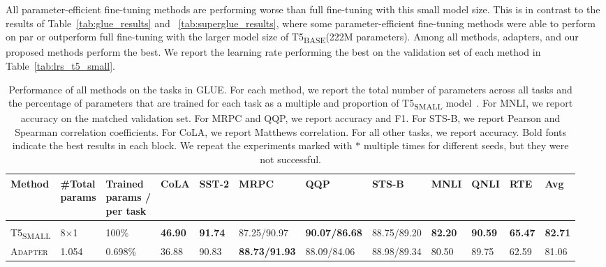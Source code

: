 \documentclass{article}
\newcommand{\basebase}{T5\textsubscript{\tiny BASE}\xspace}
\newcommand{\basesmall}{T5\textsubscript{\tiny SMALL}\xspace}
\newcommand{\adapter}{\textsc{Adapter}\xspace}
\begin{document}
All parameter-efficient fine-tuning methods are performing worse than full fine-tuning with this small model size. This is in contrast to the results of Table~\ref{tab:glue_results} and ~\ref{tab:superglue_results}, where some parameter-efficient fine-tuning methods were able to perform on par or outperform full fine-tuning with the larger model size of \basebase (222M parameters). Among all methods, adapters, and our proposed methods perform the best. We report the learning rate performing the best on the validation set of each method in Table~\ref{tab:lrs_t5_small}.
\begin{table}[H] %
\centering 
\caption{Performance of all methods on the tasks in GLUE. For each method, we report the total number of parameters across all tasks and the percentage of parameters that are trained for each task as a multiple and proportion of \basesmall model~\citep{raffel2019exploring}. For MNLI, we report accuracy on the matched validation set. For MRPC and QQP, we report accuracy and F1. For STS-B, we report Pearson and Spearman correlation coefficients. For CoLA, we report Matthews correlation. For all other tasks, we report accuracy. Bold fonts indicate the best results in each block. We repeat the experiments marked with $*$ multiple times for different seeds, but they were not successful.}
\begin{adjustbox}{max width=\textwidth}
\begin{tabular}{l@{\hskip 0.02in}|l@{\hskip 0.06in}l@{\hskip 0.0in}|l@{\hskip 0.08in}l@{\hskip 0.08in}l@{\hskip 0.08in}l@{\hskip 0.08in}l@{\hskip 0.08in}l@{\hskip 0.08in}l@{\hskip 0.08in}l|l}
\toprule %
\textbf{Method} & \pbox{3cm}{\textbf{\#Total}\\ \textbf{params}} & \pbox{3cm}{\textbf{Trained} \\ \textbf{params /}\\ \textbf{per task\vspace{0.1em}}} & \textbf{CoLA} &    \textbf{SST-2} &   \textbf{MRPC} &   \textbf{QQP} &     \textbf{STS-B} & \textbf{MNLI}  &    \textbf{QNLI} & \textbf{RTE} &   \textbf{Avg} \\
\toprule 
\rowcolor{gray!20}\multicolumn{12}{c}{\it \textbf{Baselines}}\\
\midrule 
\basesmall & 8$\times$1 &100\% & \textbf{46.90} &  \textbf{91.74} &  87.25/90.97 &  \textbf{90.07/86.68} &  88.75/89.20 &  \textbf{82.20} &  \textbf{90.59} &  \textbf{65.47} &  \textbf{82.71} \\ %
\adapter &1.054 &0.698\%& 36.88 &  90.83 &  \textbf{88.73/91.93} &  88.09/84.06 &  88.98/89.34 &  80.50 &  89.75 &  62.59 &  81.06\\ 

\end{tabular}
\end{adjustbox}
\end{table}
\end{document}

